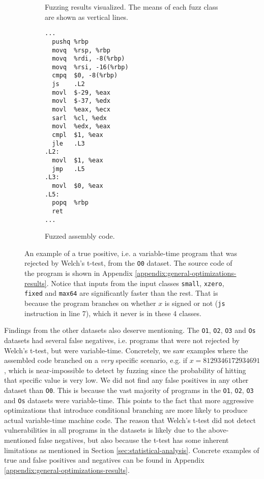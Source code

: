 \begin{figure}[]
\begin{subfigure}[b]{0.41\textwidth}
      \caption{Fuzzing results visualized. The means of each fuzz class are shown as vertical lines.}
    \end{subfigure}
    \hspace{1cm}
    \begin{subfigure}[b]{0.3\textwidth}
      \begin{lstlisting}[style=defstyle,language={[x86masm]Assembler},basicstyle=\footnotesize\ttfamily,breaklines=true]
...
  pushq	%rbp
  movq	%rsp, %rbp
  movq	%rdi, -8(%rbp)
  movq	%rsi, -16(%rbp)
  cmpq	$0, -8(%rbp)
  js	.L2
  movl	$-29, %eax
  movl	$-37, %edx
  movl	%eax, %ecx
  sarl	%cl, %edx
  movl	%edx, %eax
  cmpl	$1, %eax
  jle	.L3
.L2:
  movl	$1, %eax
  jmp	.L5
.L3:
  movl	$0, %eax
.L5:
  popq	%rbp
  ret
...\end{lstlisting} 
       \caption{Fuzzed assembly code.}
  \end{subfigure}
  \caption{An example of a true positive, i.e. a variable-time program that was rejected by Welch's t-test, from the \texttt{O0} dataset. 
  The source code of the program is shown in Appendix \ref{appendix:general-optimizations-results}. 
  Notice that inputs from the input classes \texttt{small}, \texttt{xzero}, \texttt{fixed} and \texttt{max64} are significantly faster than the rest.
  That is because the program branches on whether $x$ is signed or not (\texttt{js} instruction in line 7), which it never is in these 4 classes.}
  \label{fig:general-optimizations-O0-true-positive}
\end{figure}

Findings from the other datasets also deserve mentioning.
The \texttt{O1}, \texttt{O2}, \texttt{O3} and \texttt{Os} datasets had several false negatives, i.e. programs that were not rejected by Welch's t-test, but were variable-time.
Concretely, we saw examples where the assembled code branched on a \textit{very} specific scenario, e.g. if $x = 8129346172934691$, which is near-impossible to detect by fuzzing since the probability of hitting that specific value is very low.
We did not find any false positives in any other dataset than \texttt{O0}.
This is because the vast majority of programs in the \texttt{O1}, \texttt{O2}, \texttt{O3} and \texttt{Os} datasets were variable-time.
This points to the fact that more aggressive optimizations that introduce conditional branching are more likely to produce actual variable-time machine code.
The reason that Welch's t-test did not detect vulnerabilities in all programs in the datasets is likely due to the above-mentioned false negatives, but also because the t-test has some inherent limitations as mentioned in Section \ref{sec:statistical-analysis}.
Concrete examples of true and false positives and negatives can be found in Appendix \ref{appendix:general-optimizations-results}.

